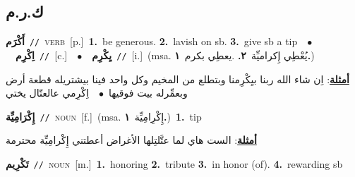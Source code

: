 \documentclass[10pt,a4paper,twoside]{article} %
\begin{document}
\begin{multicols}{2}
\vspace{-3mm}
\subsection*{\color{blue}\foreignlanguage{arabic}{ك.ر.م}\color{blue}{}} 

{\setlength\topsep{0pt}\textbf{\foreignlanguage{arabic}{أَكْرَم}}\ {\color{gray}\texttt{//}\color{black}}\ \textsc{verb}\ [p.]\ \textbf{1.}~be generous.  \textbf{2.}~lavish on sb.  \textbf{3.}~give sb a tip\ \ $\bullet$\ \ \setlength\topsep{0pt}\textbf{\foreignlanguage{arabic}{اِكْرِم}}\ {\color{gray}\texttt{//}\color{black}}\ [c.]\ \ $\bullet$\ \ \setlength\topsep{0pt}\textbf{\foreignlanguage{arabic}{يِكْرِم}}\ {\color{gray}\texttt{//}\color{black}}\ [i.]\ \color{gray}(msa. \foreignlanguage{arabic}{يُعْطِي إِكراميِّة}~\foreignlanguage{arabic}{\textbf{٢.}}  .\foreignlanguage{arabic}{يعطِي بكرم}~\foreignlanguage{arabic}{\textbf{١.}})\color{black}\  \begin{flushright}\color{gray}\foreignlanguage{arabic}{\textbf{\underline{\foreignlanguage{arabic}{أمثلة}}}: اِن شاء الله ربنا بيِكْرِمنا وبتطلع من المخيم وكل واحد فينا بيشتريله قطعة أرض وبعمِّرله بيت فوقيها\ $\bullet$\ \  اِكْرِمي عالعتّال يختي}\end{flushright}\color{black}} \vspace{2mm}

{\setlength\topsep{0pt}\textbf{\foreignlanguage{arabic}{إِكْرَامِيِّة}}\ {\color{gray}\texttt{//}\color{black}}\ \textsc{noun}\ [f.]\ \color{gray}(msa. \foreignlanguage{arabic}{إِكْرِامِيِّة}~\foreignlanguage{arabic}{\textbf{١.}})\color{black}\ \textbf{1.}~tip\  \begin{flushright}\color{gray}\foreignlanguage{arabic}{\textbf{\underline{\foreignlanguage{arabic}{أمثلة}}}: الست هاي لما عتَّلتِلها الأغراض أعطتني إِكْرامِيِّة محترمة}\end{flushright}\color{black}} \vspace{2mm}

{\setlength\topsep{0pt}\textbf{\foreignlanguage{arabic}{تَكْرِيم}}\ {\color{gray}\texttt{//}\color{black}}\ \textsc{noun}\ [m.]\ \textbf{1.}~honoring  \textbf{2.}~tribute  \textbf{3.}~in honor (of).  \textbf{4.}~rewarding sb\ } \vspace{2mm}


\end{multicols}
\end{document}
